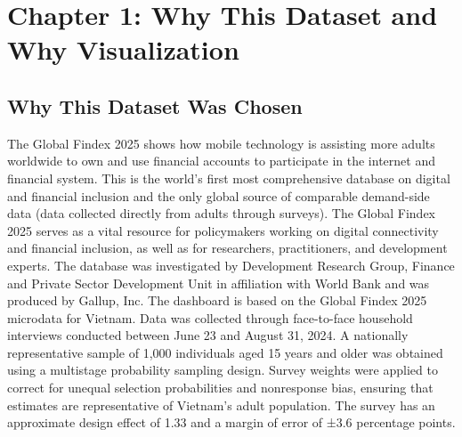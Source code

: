 \documentclass[../main.tex]{subfiles}
\begin{document}
\section{Chapter 1: Why This Dataset and Why Visualization}
\label{sec:chapter1-introduction}
\label{sec:dataset-overview}

\subsection{Why This Dataset Was Chosen}

The Global Findex 2025 shows how mobile technology is assisting more adults worldwide to own and use financial accounts to participate in the internet and financial system. This is the world's first most comprehensive database on digital and financial inclusion and the only global source of comparable demand-side data (data collected directly from adults through surveys). The Global Findex 2025 serves as a vital resource for policymakers working on digital connectivity and financial inclusion, as well as for researchers, practitioners, and development experts.
The database was investigated by Development Research Group, Finance and Private Sector Development Unit in affiliation with World Bank and was produced by Gallup, Inc. 
The dashboard is based on the Global Findex 2025 microdata for Vietnam. Data was collected through face-to-face household interviews conducted between June 23 and August 31, 2024. A nationally representative sample of 1,000 individuals aged 15 years and older was obtained using a multistage probability sampling design. Survey weights were applied to correct for unequal selection probabilities and nonresponse bias, ensuring that estimates are representative of Vietnam's adult population. The survey has an approximate design effect of 1.33 and a margin of error of ±3.6 percentage points.
\end{document}
